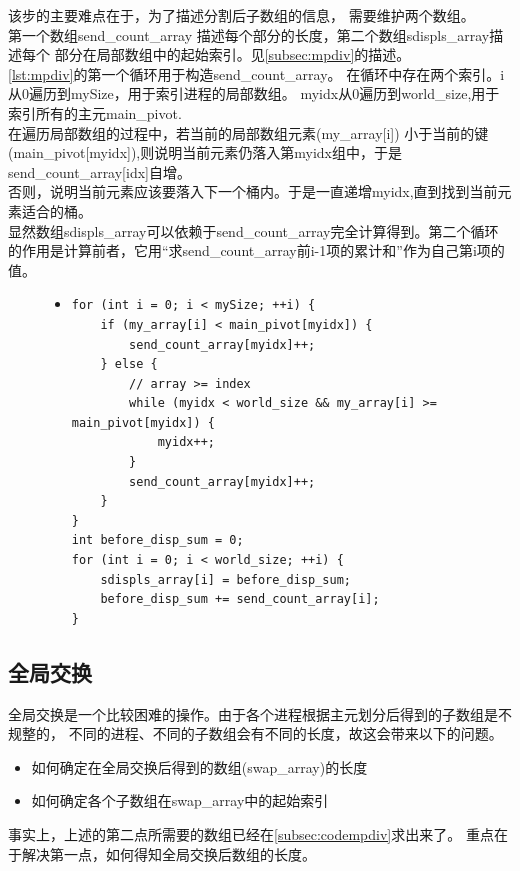 \documentclass[a4paper]{article}
\begin{document}
该步的主要难点在于，为了描述分割后子数组的信息，
需要维护两个数组。\\

第一个数组send\_count\_array
描述每个部分的长度，第二个数组sdispls\_array描述每个
部分在局部数组中的起始索引。见\autoref{subsec:mpdiv}的描述。\\

\autoref{lst:mpdiv}的第一个循环用于构造send\_count\_array。
在循环中存在两个索引。i从0遍历到mySize，用于索引进程的局部数组。
myidx从0遍历到world\_size,用于索引所有的主元main\_pivot.\\

在遍历局部数组的过程中，若当前的局部数组元素(my\_array[i])
小于当前的键(main\_pivot[myidx]),则说明当前元素仍落入第myidx组中，于是
send\_count\_array[idx]自增。\\

否则，说明当前元素应该要落入下一个桶内。于是一直递增myidx,直到找到当前元素适合的桶。\\

显然数组sdispls\_array可以依赖于send\_count\_array完全计算得到。第二个循环
的作用是计算前者，它用``求send\_count\_array前i-1项的累计和''作为自己第i项的值。
\begin{figure}[!hbt]
\begin{itemize}
\item[] \begin{lstlisting}[style=mycpp, label=lst:mpdiv, caption=各进程按照主元划分局部数组的关键代码]
for (int i = 0; i < mySize; ++i) {
    if (my_array[i] < main_pivot[myidx]) {
        send_count_array[myidx]++;
    } else {
        // array >= index
        while (myidx < world_size && my_array[i] >= main_pivot[myidx]) {
            myidx++;
        }
        send_count_array[myidx]++;
    }
}
int before_disp_sum = 0;
for (int i = 0; i < world_size; ++i) {
    sdispls_array[i] = before_disp_sum;
    before_disp_sum += send_count_array[i];
}
\end{lstlisting}
\end{itemize}
\end{figure}

\subsection{全局交换}
全局交换是一个比较困难的操作。由于各个进程根据主元划分后得到的子数组是不规整的，
不同的进程、不同的子数组会有不同的长度，故这会带来以下的问题。
\begin{itemize}
    \item 如何确定在全局交换后得到的数组(swap\_array)的长度
    \item 如何确定各个子数组在swap\_array中的起始索引
\end{itemize}
事实上，上述的第二点所需要的数组已经在\autoref{subsec:codempdiv}求出来了。
重点在于解决第一点，如何得知全局交换后数组的长度。\\
\end{document}
